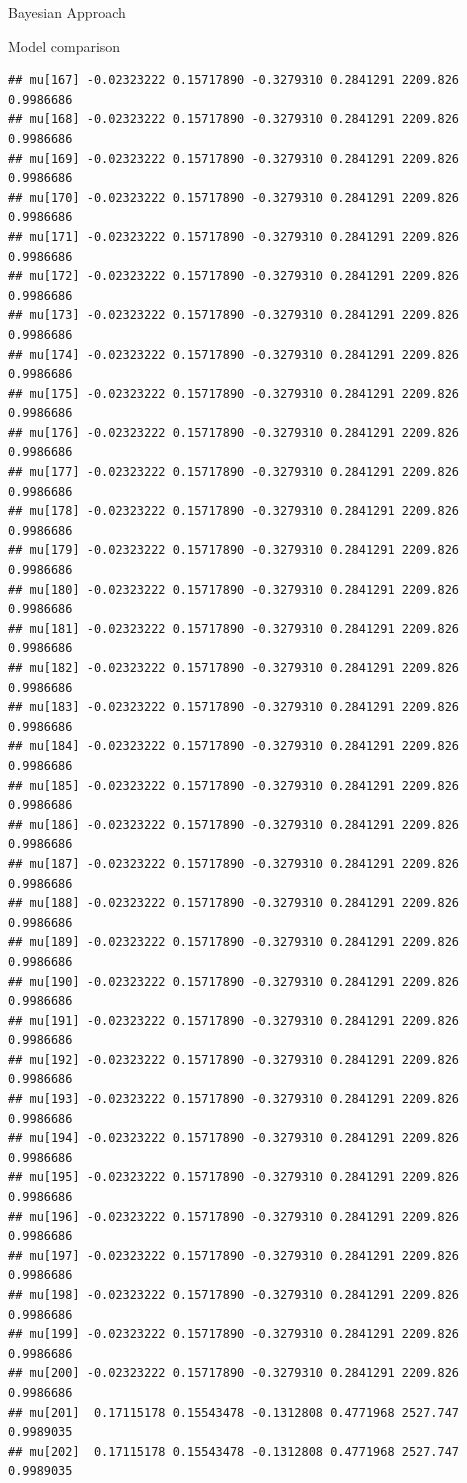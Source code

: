 \documentclass[
  ignorenonframetext,
]{beamer}
\begin{document}
\begin{frame}[fragile]{Bayesian Approach}
\begin{block}{Model comparison}
\begin{verbatim}
## mu[167] -0.02323222 0.15717890 -0.3279310 0.2841291 2209.826 0.9986686
## mu[168] -0.02323222 0.15717890 -0.3279310 0.2841291 2209.826 0.9986686
## mu[169] -0.02323222 0.15717890 -0.3279310 0.2841291 2209.826 0.9986686
## mu[170] -0.02323222 0.15717890 -0.3279310 0.2841291 2209.826 0.9986686
## mu[171] -0.02323222 0.15717890 -0.3279310 0.2841291 2209.826 0.9986686
## mu[172] -0.02323222 0.15717890 -0.3279310 0.2841291 2209.826 0.9986686
## mu[173] -0.02323222 0.15717890 -0.3279310 0.2841291 2209.826 0.9986686
## mu[174] -0.02323222 0.15717890 -0.3279310 0.2841291 2209.826 0.9986686
## mu[175] -0.02323222 0.15717890 -0.3279310 0.2841291 2209.826 0.9986686
## mu[176] -0.02323222 0.15717890 -0.3279310 0.2841291 2209.826 0.9986686
## mu[177] -0.02323222 0.15717890 -0.3279310 0.2841291 2209.826 0.9986686
## mu[178] -0.02323222 0.15717890 -0.3279310 0.2841291 2209.826 0.9986686
## mu[179] -0.02323222 0.15717890 -0.3279310 0.2841291 2209.826 0.9986686
## mu[180] -0.02323222 0.15717890 -0.3279310 0.2841291 2209.826 0.9986686
## mu[181] -0.02323222 0.15717890 -0.3279310 0.2841291 2209.826 0.9986686
## mu[182] -0.02323222 0.15717890 -0.3279310 0.2841291 2209.826 0.9986686
## mu[183] -0.02323222 0.15717890 -0.3279310 0.2841291 2209.826 0.9986686
## mu[184] -0.02323222 0.15717890 -0.3279310 0.2841291 2209.826 0.9986686
## mu[185] -0.02323222 0.15717890 -0.3279310 0.2841291 2209.826 0.9986686
## mu[186] -0.02323222 0.15717890 -0.3279310 0.2841291 2209.826 0.9986686
## mu[187] -0.02323222 0.15717890 -0.3279310 0.2841291 2209.826 0.9986686
## mu[188] -0.02323222 0.15717890 -0.3279310 0.2841291 2209.826 0.9986686
## mu[189] -0.02323222 0.15717890 -0.3279310 0.2841291 2209.826 0.9986686
## mu[190] -0.02323222 0.15717890 -0.3279310 0.2841291 2209.826 0.9986686
## mu[191] -0.02323222 0.15717890 -0.3279310 0.2841291 2209.826 0.9986686
## mu[192] -0.02323222 0.15717890 -0.3279310 0.2841291 2209.826 0.9986686
## mu[193] -0.02323222 0.15717890 -0.3279310 0.2841291 2209.826 0.9986686
## mu[194] -0.02323222 0.15717890 -0.3279310 0.2841291 2209.826 0.9986686
## mu[195] -0.02323222 0.15717890 -0.3279310 0.2841291 2209.826 0.9986686
## mu[196] -0.02323222 0.15717890 -0.3279310 0.2841291 2209.826 0.9986686
## mu[197] -0.02323222 0.15717890 -0.3279310 0.2841291 2209.826 0.9986686
## mu[198] -0.02323222 0.15717890 -0.3279310 0.2841291 2209.826 0.9986686
## mu[199] -0.02323222 0.15717890 -0.3279310 0.2841291 2209.826 0.9986686
## mu[200] -0.02323222 0.15717890 -0.3279310 0.2841291 2209.826 0.9986686
## mu[201]  0.17115178 0.15543478 -0.1312808 0.4771968 2527.747 0.9989035
## mu[202]  0.17115178 0.15543478 -0.1312808 0.4771968 2527.747 0.9989035

\end{verbatim}
\end{block}
\end{frame}
\end{document}

